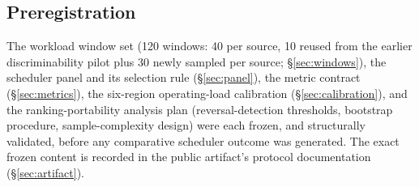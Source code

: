 \subsection{Preregistration}
\label{sec:prereg}

The workload window set (120 windows: 40 per source, 10 reused from the
earlier discriminability pilot plus 30 newly sampled per source;
\S\ref{sec:windows}), the scheduler panel and
its selection rule (\S\ref{sec:panel}), the metric contract
(\S\ref{sec:metrics}), the six-region operating-load calibration
(\S\ref{sec:calibration}), and the ranking-portability analysis plan
(reversal-detection thresholds, bootstrap procedure, sample-complexity
design) were each frozen, and structurally validated, before any
comparative scheduler outcome was generated. The exact frozen content is
recorded in the public artifact's protocol documentation
(\S\ref{sec:artifact}).
